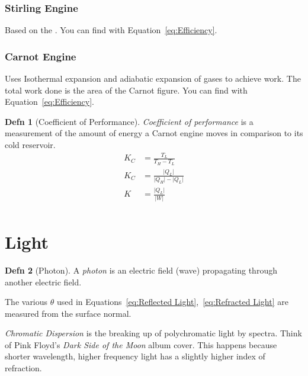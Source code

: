 \documentclass[10pt,letterpaper,final,twoside,notitlepage]{article}
\numberwithin{equation}{section} %
\theoremstyle{definition}
\newtheorem{definition}{Defn} %
\theoremstyle{remark}
\begin{document}
		\subsubsection{Stirling Engine} \label{subsubsec:Stirling Engine}
		Based on the .
		You can find  with Equation~\eqref{eq:Efficiency}.
		
		\subsubsection{Carnot Engine} \label{subsubsec:Carnot Engine}
		Uses Isothermal expansion and adiabatic expansion of gases to achieve work.
		The total work done is the area of the Carnot figure.
		You can find  with Equation~\eqref{eq:Efficiency}.
		
			\begin{definition}[Coefficient of Performance] \label{def:Coefficient of Performance}
				\emph{Coefficient of performance} is a measurement of the amount of energy a Carnot engine moves in comparison to its cold reservoir.
				\begin{equation} \label{eq:Coefficient of Performance}
					\begin{aligned}
						K_{C} &= \frac{T_{L}}{T_{H} - T_{L}} \\
						K_{C} &= \frac{\lvert Q_{L} \rvert}{\lvert Q_{H} \rvert - \lvert Q_{L} \rvert} \\
						K &= \frac{\lvert Q_{L} \rvert}{\lvert W \rvert} \\
					\end{aligned}
				\end{equation}
			\end{definition}
		
\section{Light} \label{sec:Light}
	\begin{definition}[Photon]
		A \emph{photon} is an electric field (wave) propagating through another electric field.
	\end{definition}
The various $\theta$ used in Equations~\eqref{eq:Reflected Light},~\eqref{eq:Refracted Light} are measured from the surface normal.

\emph{Chromatic Dispersion} is the breaking up of polychromatic light by spectra.
Think of Pink Floyd's \textit{Dark Side of the Moon} album cover.
This happens because shorter wavelength, higher frequency light has a slightly higher index of refraction.
\end{document}
